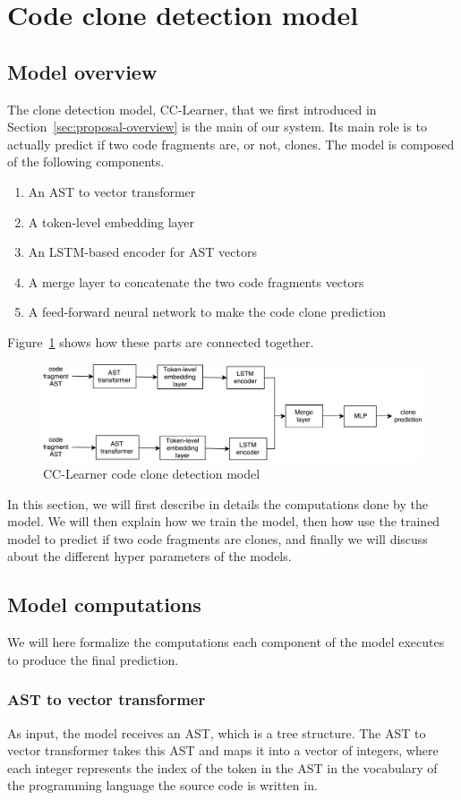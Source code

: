\section{\label{sec:clone-detection}Code clone detection model}
\subsection{Model overview}
The clone detection model, CC-Learner, that we first introduced in
Section~\ref{sec:proposal-overview} is the main of our system. Its main role is
to actually predict if two code fragments are, or not, clones. The model is
composed of the following components.
\begin{enumerate}
\item An AST to vector transformer
\item A token-level embedding layer
\item An LSTM-based encoder for AST vectors
\item A merge layer to concatenate the two code fragments vectors
\item A feed-forward neural network to make the code clone prediction
\end{enumerate}
%
Figure~\ref{fig:clone-detection-model} shows how these parts are connected
together.
%
\begin{figure}
  \centering\includegraphics[width=16cm]{./images/model-overview.pdf}
  \caption{\label{fig:clone-detection-model}CC-Learner code clone detection model}
\end{figure}
%
In this section, we will first describe in details the computations done by the
model. We will then explain how we train the model, then how use the trained
model to predict if two code fragments are clones, and finally we will discuss
about the different hyper parameters of the models.
%
\subsection{Model computations}
We will here formalize the computations each component of the model executes to
produce the final prediction.
\subsubsection{AST to vector transformer}
As input, the model receives an AST, which is a tree structure. The AST to
vector transformer takes this AST and maps it into a vector of integers, where
each integer represents the index of the token in the AST in the vocabulary of
the programming language the source code is written in.

